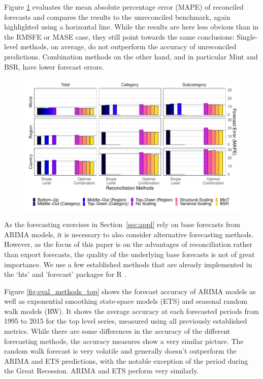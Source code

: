 Figure \ref{fig:mape} evaluates the mean absolute percentage error (MAPE) of reconciled forecasts and compares the results to the unreconciled benchmark, again highlighted using a horizontal line. While the results are here less obvious than in the RMSFE or MASE case, they still point towards the same conclusions: Single-level methods, on average, do not outperform the accuracy of unreconciled predictions. Combination methods on the other hand, and in particular Mint and BSR, have lower forecast errors. 

\begin{figure}[H]
	\includegraphics[width=\textwidth]{fig/fig_eval_mape}
	\label{fig:mape}
\end{figure}

As the forecasting exercises in Section~\ref{sec:appl} rely on base forecasts from ARIMA models, it is necessary to also consider alternative forecasting methods. However, as the focus of this paper is on the advantages of reconciliation rather than export forecasts, the quality of the underlying base forecasts is not of great importance. We use a few established methods that are already implemented in the `hts' and 'forecast' packages for R \citep[see for instance]{Hyndman2008,Hyndman2011}.

Figure \ref{fig:eval_methods_top} shows the forecast accuracy of ARIMA models as well as exponential smoothing state-space models (ETS) and seasonal random walk models (RW). It shows the average accuracy at each forecasted periods from 1995 to 2015 for the top level series, measured using all previously established metrics. While there are some differences in the accuracy of the different forecasting methods, the accuracy measures show a very similar picture. The random walk forecast is very volatile and generally doesn't outperform the ARIMA and ETS predictions, with the notable exception of the period during the Great Recession. ARIMA and ETS perform very similarly.

